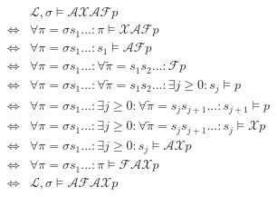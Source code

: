 
\begin{align*}
	& \mathcal{L},\sigma\vDash\mathcal{AXAF}p \\
	\Leftrightarrow & \forall\pi=\sigma s_1...: \pi\vDash\mathcal{XAF}p \\
	\Leftrightarrow & \forall\pi=\sigma s_1...: s_1\vDash\mathcal{AF}p \\
	\Leftrightarrow & \forall\pi=\sigma s_1...: \forall\tilde{\pi}=s_1s_2...:\mathcal{F}p \\
	\Leftrightarrow & \forall\pi=\sigma s_1...: \forall\tilde{\pi}=s_1s_2...:\exists j\ge 0:s_j\vDash p \\
	\Leftrightarrow & \forall\pi=\sigma s_1...: \exists j\ge 0:\forall \tilde{\pi}=s_js_{j+1}...: s_{j+1}\vDash p \\
	\Leftrightarrow & \forall\pi=\sigma s_1...: \exists j\ge 0:\forall \tilde{\pi}=s_js_{j+1}...: s_j\vDash \mathcal{X}p \\
	\Leftrightarrow & \forall\pi=\sigma s_1...: \exists j\ge 0:s_j\vDash \mathcal{AX}p \\
	\Leftrightarrow & \forall\pi=\sigma s_1...: \pi\vDash \mathcal{FAX}p \\
	\Leftrightarrow & \mathcal{L},\sigma\vDash\mathcal{AFAX}p \\
\end{align*}